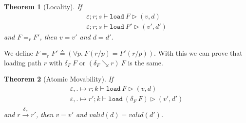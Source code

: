 \documentclass[10pt,twoside,a4paper]{article}
\theoremstyle{theorem}
\newtheorem{theorem}{Theorem}[section]
\theoremstyle{lemma}
\theoremstyle{property}
\begin{document}
\begin{theorem}[Locality]
	If
	\begin{align*}
		\varepsilon ; r ; s \vdash \mathtt{load}~ F \rhd (v,d)\\
		\varepsilon ; r ; s \vdash \mathtt{load}~ F' \rhd (v',d')
	\end{align*}
	and $F =_r F'$,
	then $v = v'$ and $d = d'$.
\label{theorem:locality}
\end{theorem}
We define $F =_r F' \triangleq (\forall p.~ F(r/p) = F'(r/p))$.
With this we can prove that loading path $r$ with $\delta_F~F$ or $(\delta_F \searrow r)~F$ is the same.


\begin{theorem}[Atomic Movability]
	If
	\begin{align*}
		\varepsilon , . \mapsto r ; k \vdash \mathtt{load}~ F \rhd (v,d)\\
		\varepsilon , . \mapsto r' ; k \vdash \mathtt{load}~ (\delta_F ~F) \rhd (v',d')\\
	\end{align*}
	and $r \xrightarrow{\delta_F} r'$,
	then $v = v'$ and $valid(d) = valid(d')$.
\label{theorem:movability}
\end{theorem}
\end{document}

